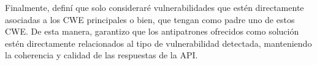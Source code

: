 Finalmente, definí que solo consideraré vulnerabilidades que estén directamente asociadas a los CWE principales o bien, que tengan como padre uno de estos CWE. De esta manera, garantizo que los antipatrones ofrecidos como solución estén directamente relacionados al tipo de vulnerabilidad detectada, manteniendo la coherencia y calidad de las respuestas de la API.



